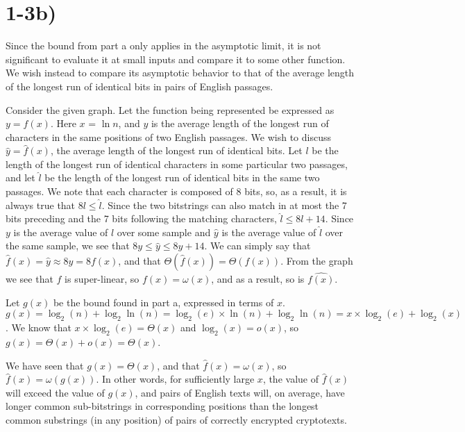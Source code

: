 \documentclass[11pt]{article}
\begin{document}
\newpage

\section*{1-3b)}

Since the bound from part a only applies in the asymptotic limit, it is not significant to evaluate it at small inputs and compare it to some other function. We wish instead to compare its asymptotic behavior to that of the average length of the longest run of identical bits in pairs of English passages.

Consider the given graph. Let the function being represented be expressed as $y = f(x)$. Here $x$ = $\ln n$, and $y$ is the average length of the longest run of characters in the same positions of two English passages. We wish to discuss $\hat{y} = \hat{f}(x)$, the average length of the longest run of identical bits. Let $l$ be the length of the longest run of identical characters in some particular two passages, and let $\hat{l}$ be the length of the longest run of identical bits in the same two passages. We note that each character is composed of $8$ bits, so, as a result, it is always true that $8l \le \hat{l}$. Since the two bitstrings can also match in at most the 7 bits preceding and the 7 bits following the matching characters, $\hat{l} \le 8l + 14$. Since $y$ is the average value of $l$ over some sample and $\hat{y}$ is the average value of $\hat{l}$ over the same sample, we see that $8y \le \hat{y} \le 8y + 14$. We can simply say that $\hat{f}(x) = \hat{y} \approx 8y = 8f(x)$, and that $\Theta(\hat{f}(x)) = \Theta(f(x))$. From the graph we see that $f$ is super-linear, so $f(x) = \omega(x)$, and as a result, so is $\hat{f(x)}$.

Let $g(x)$ be the bound found in part a, expressed in terms of $x$. $g(x) = \log_2(n)+\log_2\ln(n) = \log_2(e)\times\ln(n)+\log_2\ln(n) = x\times\log_2(e) + \log_2(x)$. We know that $x\times\log_2(e) = \Theta(x)$ and $\log_2(x) = o(x)$, so $g(x) = \Theta(x) + o(x) = \Theta(x)$.

We have seen that $g(x) = \Theta(x)$, and that $\hat{f}(x) = \omega(x)$, so $\hat{f}(x) = \omega(g(x))$. In other words, for sufficiently large $x$, the value of $\hat{f}(x)$ will exceed the value of $g(x)$, and pairs of English texts will, on average, have longer common sub-bitstrings in corresponding positions than the longest common substrings (in any position) of pairs of correctly encrypted cryptotexts. 

\newpage
\end{document}
